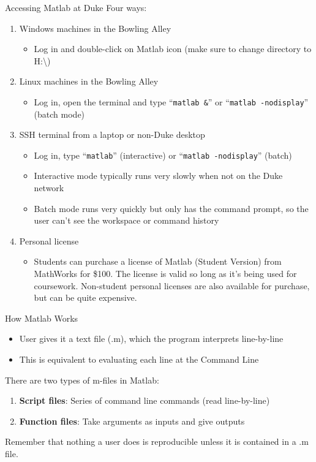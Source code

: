\documentclass[english,xcolor=dvipsnames]{beamer}
\begin{document}
\begin{frame}{Accessing Matlab at Duke}
Four ways:
	\begin{enumerate}
		\item Windows machines in the Bowling Alley
		\begin{itemize}
			\item Log in and double-click on Matlab icon (make sure to change directory to H:\textbackslash)
		\end{itemize}
		\item Linux machines in the Bowling Alley
		\begin{itemize}
			\item Log in, open the terminal and type ``\texttt{matlab \&}'' or ``\texttt{matlab -nodisplay}'' (batch mode)
		\end{itemize}
		\item SSH terminal from a laptop or non-Duke desktop
		\begin{itemize}
			\item Log in, type ``\texttt{matlab}'' (interactive) or ``\texttt{matlab -nodisplay}'' (batch)
			\item Interactive mode typically runs very slowly when not on the Duke network
			\item Batch mode runs very quickly but only has the command prompt, so the user can't see the workspace or command history
		\end{itemize}
		\item Personal license
		\begin{itemize}
			\item Students can purchase a license of Matlab (Student Version) from MathWorks for \$100. The license is valid so long as it's being used for coursework. Non-student personal licenses are also available for purchase, but can be quite expensive.
		\end{itemize}
	\end{enumerate}
\end{frame}

\begin{frame}{How Matlab Works}
\begin{itemize}
	\item User gives it a text file (.m), which the program interprets line-by-line
	\item This is equivalent to evaluating each line at the Command Line
\end{itemize}
\vspace{1cm}
There are two types of m-files in Matlab:
\begin{enumerate}
	\item \textbf{Script files}: Series of command line commands (read line-by-line)
	\item \textbf{Function files}: Take arguments as inputs and give outputs
\end{enumerate}
\vspace{1cm}
Remember that nothing a user does is reproducible unless it is contained in a .m file.
\end{frame}
\end{document}
